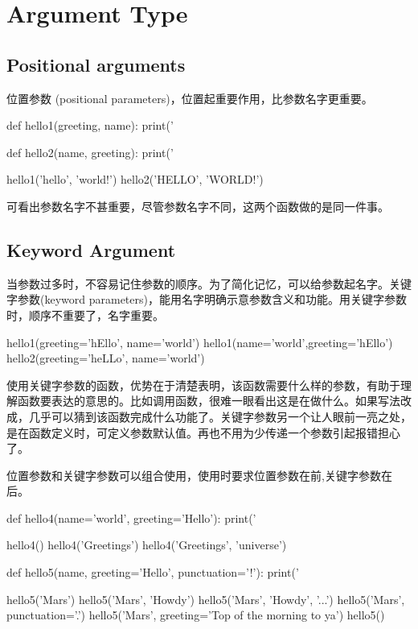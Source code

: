 \section{Argument Type}
\subsection{Positional arguments}
位置参数 (positional parameters)，位置起重要作用，比参数名字更重要。
\begin{python}
def hello1(greeting, name):
    print('%

def hello2(name, greeting):
    print('%

hello1('hello', 'world!')
hello2('HELLO', 'WORLD!')
\end{python}
可看出参数名字不甚重要，尽管参数名字不同，这两个函数做的是同一件事。
\subsection{Keyword Argument}
当参数过多时，不容易记住参数的顺序。为了简化记忆，可以给参数起名字。关键字参数(keyword parameters)，能用名字明确示意参数含义和功能。用关键字参数时，顺序不重要了，名字重要。
\begin{python}
  hello1(greeting='hEllo', name='world')
  hello1(name='world',greeting='hEllo')
  hello2(greeting='heLLo', name='world')
\end{python}
使用关键字参数的函数，优势在于清楚表明，该函数需要什么样的参数，有助于理解函数要表达的意思的。比如调用函数，很难一眼看出这是在做什么。如果写法改成，几乎可以猜到该函数完成什么功能了。关键字参数另一个让人眼前一亮之处，是在函数定义时，可定义参数默认值。再也不用为少传递一个参数引起报错担心了。

位置参数和关键字参数可以组合使用，使用时要求位置参数在前,关键字参数在后。
\begin{python}
def hello4(name='world', greeting='Hello'):
    print('%

hello4()
hello4('Greetings')
hello4('Greetings', 'universe')

def hello5(name, greeting='Hello', punctuation='!'):
    print('%

hello5('Mars')
hello5('Mars', 'Howdy')
hello5('Mars', 'Howdy', '...')
hello5('Mars', punctuation='.')
hello5('Mars', greeting='Top of the morning to ya')
hello5()
\end{python}

